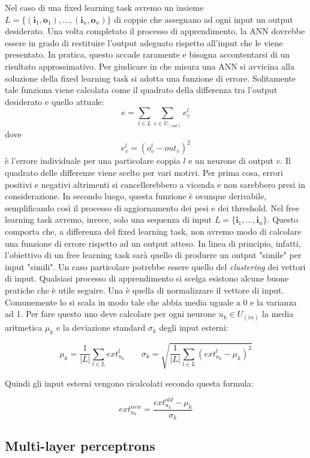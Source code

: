 \documentclass[10pt,a4paper]{article}
\newcommand{\ii}{\mathbf{i}}
\newcommand{\oo}{\mathbf{o}}
\begin{document}
Nel caso di una fixed learning task avremo un insieme 
$L=\{(\ii_1,\oo_1),\dots,(\ii_n,\oo_n)\}$ di coppie che assegnano ad ogni input un output desiderato. Una volta completato il processo di apprendimento, la ANN dovrebbe essere in grado di restituire l'output adeguato rispetto all'input che le viene presentato. In pratica, questo accade raramente e bisogna accontentarsi di un risultato approssimativo.
Per giudicare in che misura una ANN si avvicina alla soluzione della fixed learning task si adotta una funzione di errore. Solitamente tale funziona viene calcolata come il quadrato della differenza tra l'output desiderato e quello attuale:
$$
e = \sum_{l \in L} \sum_{v \in U_{(out)}} e^l_v
$$
dove
$$
e^l_v = (o^l_v - out_v)^2
$$
è l'errore individuale per una particolare coppia $l$ e un neurone di output $v$. Il quadrato delle differenze viene scelto per vari motivi. Per prima cosa, errori positivi e negativi altrimenti si cancellerebbero a vicenda e non sarebbero presi in considerazione. In secondo luogo, questa funzione è ovunque derivabile, semplificando così il processo di aggiornamento dei pesi e dei threshold.
Nel free learning task avremo, invece, solo una sequenza di input $L = \{\ii_1, \dots, \ii_n\}$. Questo comporta che, a differenza del fixed learning task, non avremo modo di calcolare una funzione di errore rispetto ad un output atteso. In linea di principio, infatti, l'obiettivo di un free learning task sarà quello di produrre un output "simile" per input "simili". Un caso particolare potrebbe essere quello del \emph{clustering} dei vettori di input. 
Qualsiasi processo di apprendimento si scelga esistono alcune buone pratiche che è utile seguire. Una è quella di normalizzare il vettore di input. Comunemente lo si scala in modo tale che abbia media uguale a 0 e la varianza ad 1. Per fare questo uno deve calcolare per ogni neurone $u_k \in U_{(in)}$ la media aritmetica $\mu_k$ e la deviazione standard $\sigma_k$ degli input esterni:

$$
\mu_k = \frac{1}{|L|}\sum_{l \in L} ext^l_{u_k} \quad \quad \sigma_k = \sqrt{\frac{1}{|L|}\sum_{l \in L} (ext^l_{u_k} - \mu_k)^2}
$$

Quindi gli input esterni vengono ricalcolati secondo questa formula:

$$
ext^{new}_{u_k} = \frac{ext^{old}_{u_k} - \mu_k}{\sigma_k}
$$

\subsection{Multi-layer perceptrons}
\end{document}
